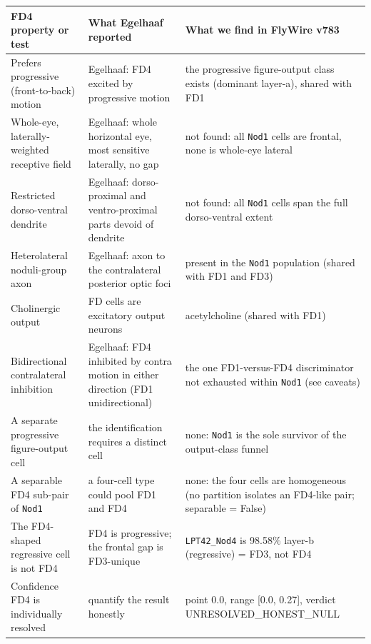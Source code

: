 \documentclass[11pt]{article}
\newcommand{\ttt}[1]{\texttt{#1}}
\begin{document}
\begin{table}[H]\centering\footnotesize\caption{Each defining property of Egelhaaf's FD4 cell and each search test, next to what we find in FlyWire v783.}\label{tab:evidence}

\renewcommand{\arraystretch}{1.25}
\setlength{\tabcolsep}{3pt}
\begin{longtable}{@{}>{\raggedright\arraybackslash}p{} >{\raggedright\arraybackslash}p{} >{\raggedright\arraybackslash}p{}@{}}
\toprule \textbf{FD4 property or test} & \textbf{What Egelhaaf reported} & \textbf{What we find in FlyWire v783} \\\midrule\endhead
Prefers progressive (front-to-back) motion & Egelhaaf: FD4 excited by progressive motion & the progressive figure-output class exists (dominant layer-a), shared with FD1 \\
Whole-eye, laterally-weighted receptive field & Egelhaaf: whole horizontal eye, most sensitive laterally, no gap & not found: all \ttt{Nod1} cells are frontal, none is whole-eye lateral \\
Restricted dorso-ventral dendrite & Egelhaaf: dorso-proximal and ventro-proximal parts devoid of dendrite & not found: all \ttt{Nod1} cells span the full dorso-ventral extent \\
Heterolateral noduli-group axon & Egelhaaf: axon to the contralateral posterior optic foci & present in the \ttt{Nod1} population (shared with FD1 and FD3) \\
Cholinergic output & FD cells are excitatory output neurons & acetylcholine (shared with FD1) \\
Bidirectional contralateral inhibition & Egelhaaf: FD4 inhibited by contra motion in either direction (FD1 unidirectional) & the one FD1-versus-FD4 discriminator not exhausted within \ttt{Nod1} (see caveats) \\
A separate progressive figure-output cell & the identification requires a distinct cell & none: \ttt{Nod1} is the sole survivor of the output-class funnel \\
A separable FD4 sub-pair of \ttt{Nod1} & a four-cell type could pool FD1 and FD4 & none: the four cells are homogeneous (no partition isolates an FD4-like pair; separable = False) \\
The FD4-shaped regressive cell is not FD4 & FD4 is progressive; the frontal gap is FD3-unique & \ttt{LPT42\_Nod4} is 98.58\% layer-b (regressive) = FD3, not FD4 \\
Confidence FD4 is individually resolved & quantify the result honestly & point 0.0, range [0.0, 0.27], verdict UNRESOLVED\_HONEST\_NULL \\
\bottomrule\end{longtable}
\renewcommand{\arraystretch}{1.0}
\setlength{\tabcolsep}{6pt}

\end{table}
\end{document}
